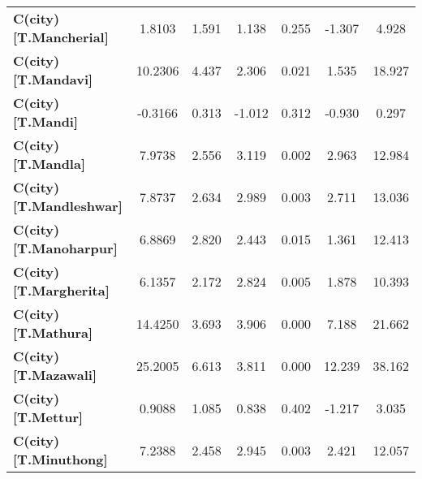 \begin{center}
\begin{tabular}{lcccccc}
\textbf{C(city)[T.Mancherial]}                                                                      &       1.8103  &        1.591     &     1.138  &         0.255        &       -1.307    &        4.928     \\
\textbf{C(city)[T.Mandavi]}                                                                         &      10.2306  &        4.437     &     2.306  &         0.021        &        1.535    &       18.927     \\
\textbf{C(city)[T.Mandi]}                                                                           &      -0.3166  &        0.313     &    -1.012  &         0.312        &       -0.930    &        0.297     \\
\textbf{C(city)[T.Mandla]}                                                                          &       7.9738  &        2.556     &     3.119  &         0.002        &        2.963    &       12.984     \\
\textbf{C(city)[T.Mandleshwar]}                                                                     &       7.8737  &        2.634     &     2.989  &         0.003        &        2.711    &       13.036     \\
\textbf{C(city)[T.Manoharpur]}                                                                      &       6.8869  &        2.820     &     2.443  &         0.015        &        1.361    &       12.413     \\
\textbf{C(city)[T.Margherita]}                                                                      &       6.1357  &        2.172     &     2.824  &         0.005        &        1.878    &       10.393     \\
\textbf{C(city)[T.Mathura]}                                                                         &      14.4250  &        3.693     &     3.906  &         0.000        &        7.188    &       21.662     \\
\textbf{C(city)[T.Mazawali]}                                                                        &      25.2005  &        6.613     &     3.811  &         0.000        &       12.239    &       38.162     \\
\textbf{C(city)[T.Mettur]}                                                                          &       0.9088  &        1.085     &     0.838  &         0.402        &       -1.217    &        3.035     \\
\textbf{C(city)[T.Minuthong]}                                                                       &       7.2388  &        2.458     &     2.945  &         0.003        &        2.421    &       12.057     \\

\end{tabular}
\end{center}
